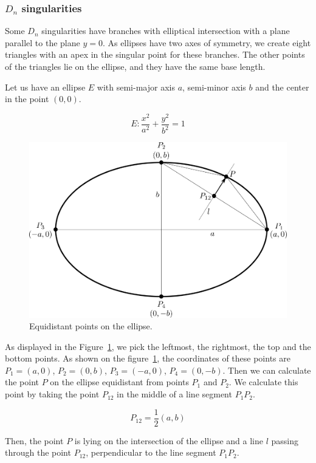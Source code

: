 \subsubsection*{$D_n$ singularities}
Some $D_n$ singularities have branches with elliptical intersection with 
a plane parallel to the plane $y=0$. As ellipses have two axes of symmetry,
we create eight triangles with an apex in the singular point for these branches.
The other points of the triangles lie on the ellipse, and they have the same base length.

Let us have an ellipse $E$ with semi-major axis $a$, semi-minor axis $b$ 
and the center in the point $(0, 0)$.

$$E: \frac{x^2}{a^2} + \frac{y^2}{b^2} = 1$$
\begin{figure}
    \centerline{\includegraphics[scale=0.5]{images/img13}}
    \caption[Equidistant points on ellipse.]
    {Equidistant points on the ellipse.}
    \label{img:13}
\end{figure}
As displayed in the Figure~\ref{img:13}, we pick the leftmost, the rightmost, the top
and the bottom points. As shown on the figure~\ref{img:13}, the coordinates of these 
points are $P_1 = (a, 0)$, $P_2 = (0, b)$, $P_3=(-a, 0)$, $P_4 = (0, -b)$.
Then we can calculate the point $P$ on the ellipse equidistant
from points $P_1$ and $P_2$. We calculate this point by taking the point $P_{12}$ 
in the middle of a line segment $P_1P_2$. 

$$P_{12} = \frac{1}{2}(a, b)$$

Then, the point $P$ is lying on the
intersection of the ellipse and a line $l$ passing through the point $P_{12}$, perpendicular to the
line segment $P_1P_2$.


